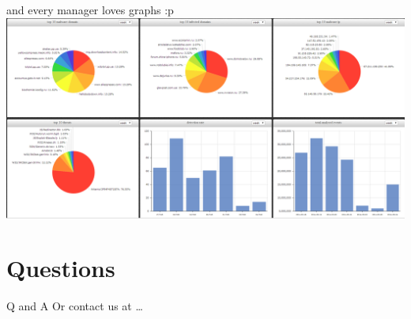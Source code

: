 \documentclass[presentation,smaller]{beamer}
\begin{document}
\begin{frame}[label=sec-7-14]{and every manager loves graphs :p}
\includegraphics[width=14cm]{images/ioc02.png}
\end{frame}

\section{Questions}
\label{sec-8}
\begin{frame}[label=sec-8-1]{Q and A}
Or contact us at \ldots{}
\end{frame}
\end{document}
